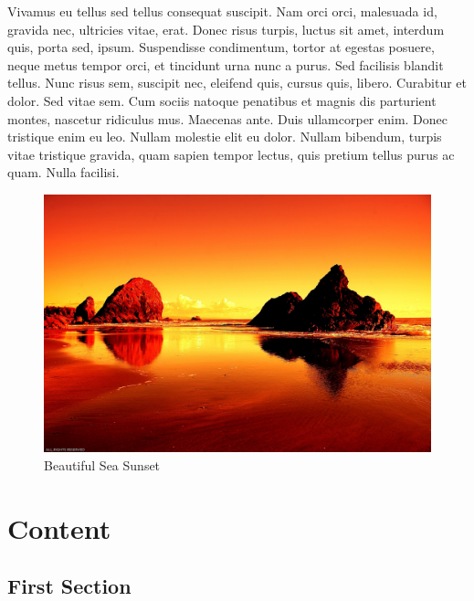 \documentclass[portable]{yReport}
\begin{document}
	\lipsum[3]
	
	
	Vivamus eu tellus sed tellus consequat suscipit. Nam orci orci, malesuada
	id, gravida nec, ultricies vitae, erat. Donec risus turpis, luctus sit amet, interdum quis, porta sed, ipsum. Suspendisse condimentum, tortor at egestas
	posuere, neque metus tempor orci, et tincidunt urna nunc a purus. Sed
	facilisis blandit tellus. Nunc risus sem, suscipit nec, eleifend quis, cursus
	quis, libero. Curabitur et dolor. Sed vitae sem\sideNote{\lipsum[27]}. Cum sociis natoque penatibus et magnis dis parturient montes, nascetur ridiculus mus. Maecenas
	ante. Duis ullamcorper enim. Donec tristique enim eu leo. Nullam molestie
	elit eu dolor. Nullam bibendum, turpis vitae tristique gravida, quam sapien
	tempor lectus, quis pretium tellus purus ac quam. Nulla facilisi.
	
	\lipsum[26]
	
	\begin{figure}
		\includegraphics[width=\linewidth]{images/sunset.jpg}
		\caption{Beautiful Sea Sunset}
	\end{figure}
	
	
	
	\chapter{Content}
	\lipsum[2]
	\lipsum[3]
	
	\section{First Section}
\end{document}

